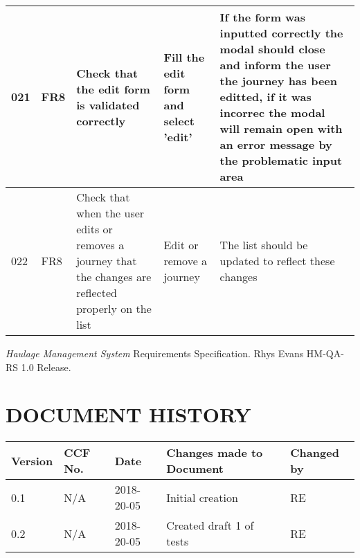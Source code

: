 \documentclass{project}
\begin{document}
\begin{longtable}{|p{0.7cm}|p{1cm}|p{3.5cm}|p{3.2cm}|p{3.5cm}|}
	021 & FR8 & Check that the edit form is validated correctly & Fill the edit form and select 'edit' & If the form was inputted correctly the modal should close and inform the user the journey has been editted, if it was incorrec the modal will remain open with an error message by the problematic input area \\ \hline
	022 & FR8 & Check that when the user edits or removes a journey that the changes are reflected properly on the list & Edit or remove a journey & The list should be updated to reflect these changes\\ \hline   
\end{longtable}

\clearpage
{}
\begin{thebibliography}{5}
	 \emph{Haulage Management System}
	Requirements Specification.
	Rhys Evans HM-QA-RS 1.0 Release.
\end{thebibliography}

\clearpage
{}
\section*{DOCUMENT HISTORY}
\begin{tabular}{|l | l | l | l | l |}
	\hline
	Version & CCF No. & Date & Changes made to Document & Changed by \\
	\hline
	0.1 & N/A & 2018-20-05 & Initial creation & RE \\
	0.2 & N/A & 2018-20-05 & Created draft 1 of tests & RE \\
	
	\hline
\end{tabular}
\label{thelastpage}
\end{document}
